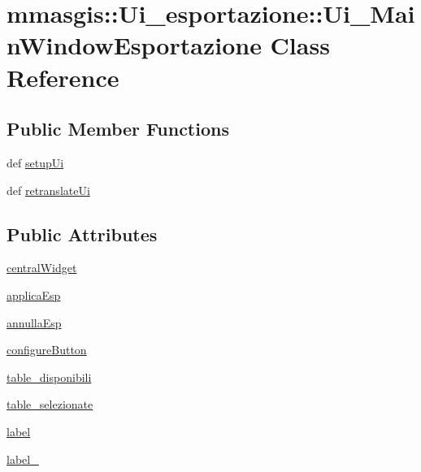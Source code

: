 \hypertarget{classmmasgis_1_1Ui__esportazione_1_1Ui__MainWindowEsportazione}{
\section{mmasgis::Ui\_\-esportazione::Ui\_\-MainWindowEsportazione Class Reference}
\label{classmmasgis_1_1Ui__esportazione_1_1Ui__MainWindowEsportazione}
}
\subsection*{Public Member Functions}
\begin{DoxyCompactItemize}
\item 
def \hyperlink{classmmasgis_1_1Ui__esportazione_1_1Ui__MainWindowEsportazione_a80eaf8c7e6a7e78fb214e4f7e76c4a6d}{setupUi}
\item 
def \hyperlink{classmmasgis_1_1Ui__esportazione_1_1Ui__MainWindowEsportazione_ac0b6d7fbc3cd8bcaedc333d5050b6f6d}{retranslateUi}
\end{DoxyCompactItemize}
\subsection*{Public Attributes}
\begin{DoxyCompactItemize}
\item 
\hyperlink{classmmasgis_1_1Ui__esportazione_1_1Ui__MainWindowEsportazione_a7ef710128ebad4819cc30dcbad4f3387}{centralWidget}
\item 
\hyperlink{classmmasgis_1_1Ui__esportazione_1_1Ui__MainWindowEsportazione_a2868f3c1dbad3427c46f9bb5add84ea0}{applicaEsp}
\item 
\hyperlink{classmmasgis_1_1Ui__esportazione_1_1Ui__MainWindowEsportazione_a88c6d6cd42ed5b88ab027f559a9be9d8}{annullaEsp}
\item 
\hyperlink{classmmasgis_1_1Ui__esportazione_1_1Ui__MainWindowEsportazione_a35d3e926854b740ba26e5626b208c41f}{configureButton}
\item 
\hyperlink{classmmasgis_1_1Ui__esportazione_1_1Ui__MainWindowEsportazione_a4258584408a95637a9043c997ef37550}{table\_\-disponibili}
\item 
\hyperlink{classmmasgis_1_1Ui__esportazione_1_1Ui__MainWindowEsportazione_a9deebaf3dd9e23351d01f6b29272408f}{table\_\-selezionate}
\item 
\hyperlink{classmmasgis_1_1Ui__esportazione_1_1Ui__MainWindowEsportazione_af7dc283a3e4ed480781cbc668270ad02}{label}
\item 
\hyperlink{classmmasgis_1_1Ui__esportazione_1_1Ui__MainWindowEsportazione_a357b8f76e6bb3849094726747ca720f2}{label\_}
\end{DoxyCompactItemize}


